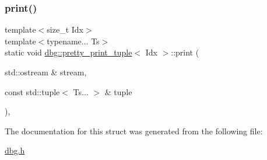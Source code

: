 \subsubsection{\texorpdfstring{print()}{print()}}
{\footnotesize\ttfamily template$<$size\+\_\+t Idx$>$ \\
template$<$typename... Ts$>$ \\
static void \hyperlink{structdbg_1_1pretty__print__tuple}{dbg\+::pretty\+\_\+print\+\_\+tuple}$<$ Idx $>$\+::print (\begin{DoxyParamCaption}\item[{std\+::ostream \&}]{stream,  }\item[{const std\+::tuple$<$ Ts... $>$ \&}]{tuple }\end{DoxyParamCaption})\hspace{0.3cm}{\ttfamily [inline]}, {\ttfamily [static]}}



The documentation for this struct was generated from the following file\+:\begin{DoxyCompactItemize}
\item 
\hyperlink{dbg_8h}{dbg.\+h}\end{DoxyCompactItemize}
